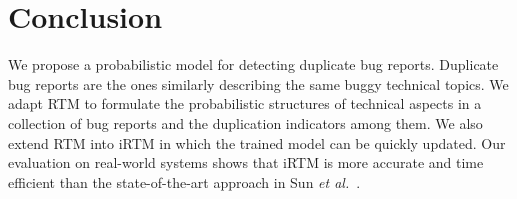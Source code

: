\section{Conclusion}

We propose a probabilistic model for detecting duplicate bug
reports. 
Duplicate bug reports are the ones similarly describing the same buggy
technical topics. We adapt RTM to formulate the probabilistic
structures of technical aspects in a collection of bug reports and the
duplication indicators among them.
We also extend RTM into iRTM in which the trained model can be quickly
updated. Our evaluation on real-world systems shows that iRTM is more
accurate and time efficient than the state-of-the-art approach in Sun
{\em et al.}~\cite{davidlo10}.

